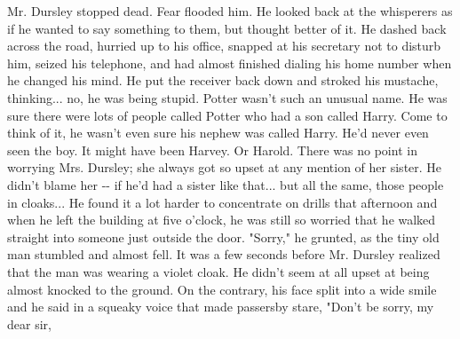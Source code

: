 \documentclass{article}%
\begin{document}
\newline%
Mr. Dursley stopped dead. Fear flooded him. He looked back at the
\newline%
whisperers as if he wanted to say something to them, but thought better
\newline%
of it.
\newline%
He dashed back across the road, hurried up to his office, snapped at his
\newline%
secretary not to disturb him, seized his telephone, and had almost
\newline%
finished dialing his home number when he changed his mind. He put the
\newline%
receiver back down and stroked his mustache, thinking... no, he was
\newline%
being stupid. Potter wasn't such an unusual name. He was sure there were
\newline%
lots of people called Potter who had a son called Harry. Come to think
\newline%
of it, he wasn't even sure his nephew was called Harry. He'd never even
\newline%
seen the boy. It might have been Harvey. Or Harold. There was no point
\newline%
in worrying Mrs. Dursley; she always got so upset at any mention of her
\newline%
sister. He didn't blame her {-}{-} if he'd had a sister like that... but all
\newline%
the same, those people in cloaks...
\newline%
He found it a lot harder to concentrate on drills that afternoon and
\newline%
when he left the building at five o'clock, he was still so worried that
\newline%
he walked straight into someone just outside the door.
\newline%
"Sorry," he grunted, as the tiny old man stumbled and almost fell. It
\newline%
was a few seconds before Mr. Dursley realized that the man was wearing a
\newline%
violet cloak. He didn't seem at all upset at being almost knocked to the
\newline%
ground. On the contrary, his face split into a wide smile and he said in
\newline%
a squeaky voice that made passersby stare, "Don't be sorry, my dear sir,
\newline%
\end{document}
